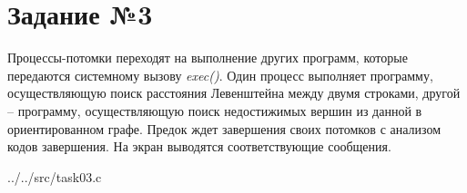 \section*{Задание №3}

Процессы-потомки переходят на выполнение других программ, которые передаются
системному вызову \textit{exec()}. Один процесс выполняет программу,
осуществляющую поиск расстояния Левенштейна между двумя строками, другой --
программу, осуществляющую поиск недостижимых вершин из данной в ориентированном
графе. Предок ждет завершения своих потомков с анализом кодов завершения. На
экран выводятся соответствующие сообщения.

\begin{lstinputlisting}[
    caption={Системный вызов exec()},
	label={lst:exec}
]{../../src/task03.c}
\end{lstinputlisting}

